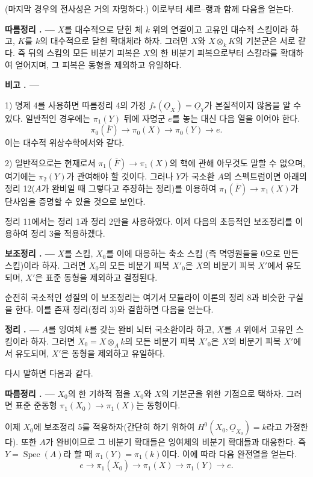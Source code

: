 \documentclass[11pt,twoside,openany]{book}
\numberwithin{equation}{section}
\newcommand{\sourceunit}{front}
\newcommand{\src}[1]{%
  \phantomsection\hypertarget{src:\sourceunit:#1}{}%
  \marginpar{\raggedleft\footnotesize\sffamily #1}%
}
\newcommand{\Osh}{\underline{O}}
\theoremstyle{plain}
\theoremstyle{definition}
\theoremstyle{remark}
\newcommand{\result}[2]{%
  \par\medskip\noindent\textbf{#1%
  \if\relax\detokenize{#2}\relax\else\space#2\fi. ---}\enspace
}
\begin{document}
(마지막 경우의 전사성은 거의 자명하다.) 이로부터 세르--랭과 함께 다음을
얻는다.

\result{따름정리}{6} $X$를 대수적으로 닫힌 체 $k$ 위의 연결이고 고유인
대수적 스킴이라 하고, $K$를 $k$의 대수적으로 닫힌 확대체라 하자. 그러면
$X$와 $X\otimes_kK$의 기본군은 서로 같다. 즉 뒤의 스킴의 모든 비분기
피복은 $X$의 한 비분기 피복으로부터 스칼라를 확대하여 얻어지며, 그 피복은
동형을 제외하고 유일하다.

\result{비고}{}

1) 명제 4를 사용하면 따름정리 4의 가정 $f_*(\Osh_X)=\Osh_Y$가 본질적이지
않음을 알 수 있다. 일반적인 경우에는 $\pi_1(Y)$ 뒤에 자명군 $e$를 놓는
대신 다음 열을 이어야 한다.
\[
  \pi_0(\overline F)\longrightarrow\pi_0(X)
  \longrightarrow\pi_0(Y)\longrightarrow e.
\]
이는 대수적 위상수학에서와 같다.

\src{216}
2) 일반적으로는 현재로서
$\pi_1(\overline F)\longrightarrow\pi_1(X)$의 핵에 관해 아무것도 말할 수
없으며, 여기에는 $\pi_2(Y)$가 관여해야 할 것이다. 그러나 $Y$가 국소환
$A$의 스펙트럼이면 아래의 정리 12($A$가 완비일 때 그렇다고 주장하는
정리)를 이용하여 $\pi_1(\overline F)\longrightarrow\pi_1(X)$가 단사임을
증명할 수 있을 것으로 보인다.

정리 11에서는 정리 1과 정리 2만을 사용하였다. 이제 다음의 초등적인
보조정리를 이용하여 정리 3을 적용하겠다.

\result{보조정리}{6} $X$를 스킴, $X_0$를 이에 대응하는 축소 스킴
(즉 멱영원들을 0으로 만든 스킴)이라 하자. 그러면 $X_0$의 모든 비분기
피복 $X'_0$은 $X$의 비분기 피복 $X'$에서 유도되며, $X'$은 표준 동형을
제외하고 결정된다.

순전히 국소적인 성질의 이 보조정리는 여기서 모듈라이 이론의 정리 8과
비슷한 구실을 한다. 이를 존재 정리(정리 3)와 결합하면 다음을 얻는다.

\result{정리}{12} $A$를 잉여체 $k$를 갖는 완비 뇌터 국소환이라 하고,
$X$를 $A$ 위에서 고유인 스킴이라 하자. 그러면
$X_0=X\otimes_A k$의 모든 비분기 피복 $X'_0$은 $X$의 비분기 피복
$X'$에서 유도되며, $X'$은 동형을 제외하고 유일하다.

다시 말하면 다음과 같다.

\result{따름정리}{1} $X_0$의 한 기하적 점을 $X_0$와 $X$의 기본군을 위한
기점으로 택하자. 그러면 표준 준동형
$\pi_1(X_0)\longrightarrow\pi_1(X)$는 동형이다.

이제 $X_0$에 보조정리 5를 적용하자(간단히 하기 위하여
$H^0(X_0,\Osh_{X_0})=k$라고 가정한다). 또한 $A$가 완비이므로 그 비분기
확대들은 잉여체의 비분기 확대들과 대응한다. 즉
$Y=\operatorname{Spec}(A)$라 할 때 $\pi_1(Y)=\pi_1(k)$이다. 이에 따라
다음 완전열을 얻는다.
\[
  e\longrightarrow\pi_1(\overline X_0)
  \longrightarrow\pi_1(X)\longrightarrow\pi_1(Y)\longrightarrow e.
\]
\end{document}
